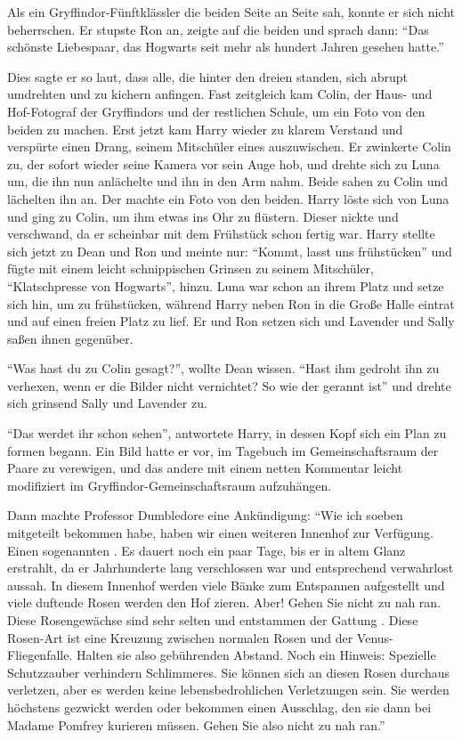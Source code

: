 Als ein Gryffindor-Fünftklässler die beiden Seite an Seite sah, konnte er sich nicht beherrschen. Er stupste Ron an, zeigte auf die beiden und sprach dann: \enquote{Das schönste Liebespaar, das Hogwarts seit mehr als hundert Jahren gesehen hatte.}

Dies sagte er so laut, dass alle, die hinter den dreien standen, sich abrupt umdrehten und zu kichern anfingen. Fast zeitgleich kam Colin, der Haus- und Hof-Fotograf der Gryffindors und der restlichen Schule, um ein Foto von den beiden zu machen. Erst jetzt kam Harry wieder zu klarem Verstand und verspürte einen Drang, seinem Mitschüler eines auszuwischen. Er zwinkerte Colin zu, der sofort wieder seine Kamera vor sein Auge hob, und drehte sich zu Luna um, die ihn nun anlächelte und ihn in den Arm nahm. Beide sahen zu Colin und lächelten ihn an. Der machte ein Foto von den beiden. Harry löste sich von Luna und ging zu Colin, um ihm etwas ins Ohr zu flüstern. Dieser nickte und verschwand, da er scheinbar mit dem Frühstück schon fertig war. Harry stellte sich jetzt zu Dean und Ron und meinte nur: \enquote{Kommt, lasst uns frühstücken} und fügte mit einem leicht schnippischen Grinsen zu seinem Mitschüler, \enquote{Klatschpresse von Hogwarts}, hinzu. Luna war schon an ihrem Platz und setze sich hin, um zu frühstücken, während Harry neben Ron in die Große Halle eintrat und auf einen freien Platz zu lief. Er und Ron setzen sich und Lavender und Sally saßen ihnen gegenüber.

\enquote{Was hast du zu Colin gesagt?}, wollte Dean wissen. \enquote{Hast ihm gedroht ihn zu verhexen, wenn er die Bilder nicht vernichtet? So wie der gerannt ist} und drehte sich grinsend Sally und Lavender zu.

\enquote{Das werdet ihr schon sehen}, antwortete Harry, in dessen Kopf sich ein Plan zu formen begann. Ein Bild hatte er vor, im Tagebuch im Gemeinschaftsraum der Paare zu verewigen, und das andere mit einem netten Kommentar leicht modifiziert im Gryffindor-Gemeinschaftsraum aufzuhängen.

Dann machte Professor Dumbledore eine Ankündigung: \enquote{Wie ich soeben mitgeteilt bekommen habe, haben wir einen weiteren Innenhof zur Verfügung. Einen sogenannten . Es dauert noch ein paar Tage, bis er in altem Glanz erstrahlt, da er Jahrhunderte lang verschlossen war und entsprechend verwahrlost aussah. In diesem Innenhof werden viele Bänke zum Entspannen aufgestellt und viele duftende Rosen werden den Hof zieren. \gst Aber! Gehen Sie nicht zu nah ran. Diese Rosengewächse sind sehr selten und entstammen der Gattung . Diese Rosen-Art ist eine Kreuzung zwischen normalen Rosen und der Venus-Fliegenfalle. Halten sie also gebührenden Abstand. \gst Noch ein Hinweis: Spezielle Schutzzauber verhindern Schlimmeres. Sie können sich an diesen Rosen durchaus verletzen, aber es werden keine lebensbedrohlichen Verletzungen sein. Sie werden höchstens gezwickt werden oder bekommen einen Ausschlag, den sie dann bei Madame Pomfrey kurieren müssen. Gehen Sie also nicht zu nah ran.}

